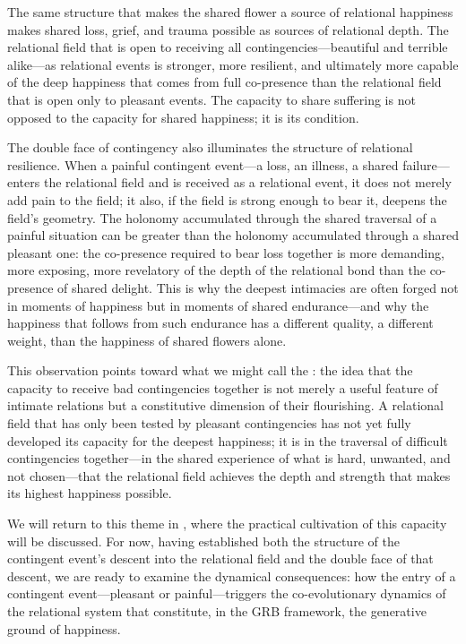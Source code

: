 \begin{claim}
The same structure that makes the shared flower a source of relational happiness makes shared loss, grief, and trauma possible as sources of relational depth. The relational field that is open to receiving all contingencies---beautiful and terrible alike---as relational events is stronger, more resilient, and ultimately more capable of the deep happiness that comes from full co-presence than the relational field that is open only to pleasant events. The capacity to share suffering is not opposed to the capacity for shared happiness; it is its condition.
\end{claim}

The double face of contingency also illuminates the structure of relational resilience. When a painful contingent event---a loss, an illness, a shared failure---enters the relational field and is received as a relational event, it does not merely add pain to the field; it also, if the field is strong enough to bear it, deepens the field's geometry. The holonomy accumulated through the shared traversal of a painful situation can be greater than the holonomy accumulated through a shared pleasant one: the co-presence required to bear loss together is more demanding, more exposing, more revelatory of the depth of the relational bond than the co-presence of shared delight. This is why the deepest intimacies are often forged not in moments of happiness but in moments of shared endurance---and why the happiness that follows from such endurance has a different quality, a different weight, than the happiness of shared flowers alone.

This observation points toward what we might call the : the idea that the capacity to receive bad contingencies together is not merely a useful feature of intimate relations but a constitutive dimension of their flourishing. A relational field that has only been tested by pleasant contingencies has not yet fully developed its capacity for the deepest happiness; it is in the traversal of difficult contingencies together---in the shared experience of what is hard, unwanted, and not chosen---that the relational field achieves the depth and strength that makes its highest happiness possible.

We will return to this theme in , where the practical cultivation of this capacity will be discussed. For now, having established both the structure of the contingent event's descent into the relational field and the double face of that descent, we are ready to examine the dynamical consequences: how the entry of a contingent event---pleasant or painful---triggers the co-evolutionary dynamics of the relational system that constitute, in the GRB framework, the generative ground of happiness.
